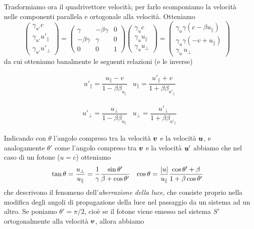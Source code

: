 Trasformiamo ora il quadrivettore velocità; per farlo scomponiamo la velocità nelle componenti parallela e ortogonale alla velocità. Otteniamo
\begin{equation}
\begin{pmatrix}
\gamma_{u'}c \\
\gamma_{u'}u'_{\|} \\
\gamma_{u'}u'_\bot
\end{pmatrix}
= 
\begin{pmatrix}
\gamma&-\beta\gamma &0\\
-\beta\gamma &\gamma & 0\\
0&0&1
\end{pmatrix}
\begin{pmatrix}
\gamma_{u}c \\
\gamma_{u}u_{\|} \\
\gamma_{u}u_\bot
\end{pmatrix} 
=
\begin{pmatrix}
\gamma_u \gamma (c-\beta u_{\|}) \\
\gamma_u \gamma (-v+u_{\|}) \\
\gamma_u \, u_\bot
\end{pmatrix}
\end{equation}
da cui otteniamo banalmente le seguenti relazioni (e le inverse)
\begin{EQ}
\begin{align}
&u'_\| = \dfrac{u_\|-v}{1-\beta\beta_{u_\|}}
&u_\| = \dfrac{u'_\|+v}{1+\beta\beta_{u'_\|}}
\end{align}
\end{EQ}
\begin{EQ}
\begin{align}
&u'_\bot= \dfrac{u_\bot}{1-\beta\beta_{u_\|}}
&u_\bot = \dfrac{u'_\bot}{1+\beta\beta_{u'_\|}}
\end{align}
\end{EQ}
Indicando con $\theta$ l'angolo compreso tra la velocità $\V{v}$ e la velocità $\V{u}$, e analogamente $\theta '$ come l'angolo compreso tra $\V{v}$ e la velocità $\V{u}'$ abbiamo che  nel caso di un fotone ($u=c$) otteniamo
\begin{align}
&\tan\theta = \dfrac{u_\bot}{u_\|} = \dfrac{1}{\gamma} \dfrac{\sin\theta '}{\beta + \cos\theta'}
&\cos\theta =\dfrac{|u|}{u_\|} \dfrac{\cos\theta ' + \beta}{1+\beta\cos\theta '}
\end{align}
che descrivono il fenomeno dell'\textit{aberrazione della luce}, che consiste proprio nella modifica degli angoli di propagazione della luce nel passaggio da un sistema ad un altro. Se poniamo $\theta'=\pi/2$, cioè se il fotone viene emesso nel sistema $S'$ ortogonalmente alla velocità $\V{v}$, allora abbiamo

